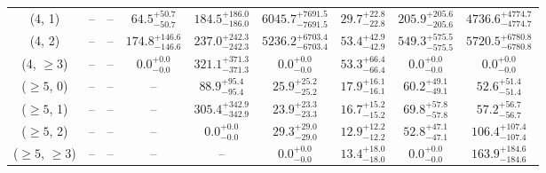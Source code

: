 \begin{table}[h!]
{\begin{tabular}{ccccccccc}
	(4, 1) & -- & -- & $64.5^{+ 50.7 }_{- 50.7 }$ & $184.5^{+ 186.0 }_{- 186.0 }$ & $6045.7^{+ 7691.5 }_{- 7691.5 }$ & $29.7^{+ 22.8 }_{- 22.8 }$ & $205.9^{+ 205.6 }_{- 205.6 }$ & $4736.6^{+ 4774.7 }_{- 4774.7 }$ \\[0.5ex] 
	(4, 2) & -- & -- & $174.8^{+ 146.6 }_{- 146.6 }$ & $237.0^{+ 242.3 }_{- 242.3 }$ & $5236.2^{+ 6703.4 }_{- 6703.4 }$ & $53.4^{+ 42.9 }_{- 42.9 }$ & $549.3^{+ 575.5 }_{- 575.5 }$ & $5720.5^{+ 6780.8 }_{- 6780.8 }$ \\[0.5ex] 
	(4, $\ge3$) & -- & -- & $0.0^{+ 0.0 }_{- 0.0 }$ & $321.1^{+ 371.3 }_{- 371.3 }$ & $0.0^{+ 0.0 }_{- 0.0 }$ & $53.3^{+ 66.4 }_{- 66.4 }$ & $0.0^{+ 0.0 }_{- 0.0 }$ & $0.0^{+ 0.0 }_{- 0.0 }$ \\[0.5ex] 
	($\ge5$, 0) & -- & -- & -- & $88.9^{+ 95.4 }_{- 95.4 }$ & $25.9^{+ 25.2 }_{- 25.2 }$ & $17.9^{+ 16.1 }_{- 16.1 }$ & $60.2^{+ 49.1 }_{- 49.1 }$ & $52.6^{+ 51.4 }_{- 51.4 }$ \\[0.5ex] 
	($\ge5$, 1) & -- & -- & -- & $305.4^{+ 342.9 }_{- 342.9 }$ & $23.9^{+ 23.3 }_{- 23.3 }$ & $16.7^{+ 15.2 }_{- 15.2 }$ & $69.8^{+ 57.8 }_{- 57.8 }$ & $57.2^{+ 56.7 }_{- 56.7 }$ \\[0.5ex] 
	($\ge5$, 2) & -- & -- & -- & $0.0^{+ 0.0 }_{- 0.0 }$ & $29.3^{+ 29.0 }_{- 29.0 }$ & $12.9^{+ 12.2 }_{- 12.2 }$ & $52.8^{+ 47.1 }_{- 47.1 }$ & $106.4^{+ 107.4 }_{- 107.4 }$ \\[0.5ex] 
	($\ge5$, $\ge3$) & -- & -- & -- & -- & $0.0^{+ 0.0 }_{- 0.0 }$ & $13.4^{+ 18.0 }_{- 18.0 }$ & $0.0^{+ 0.0 }_{- 0.0 }$ & $163.9^{+ 184.6 }_{- 184.6 }$ \\[0.5ex] 
	\hline
	\hline
\end{tabular}}
\end{table}
